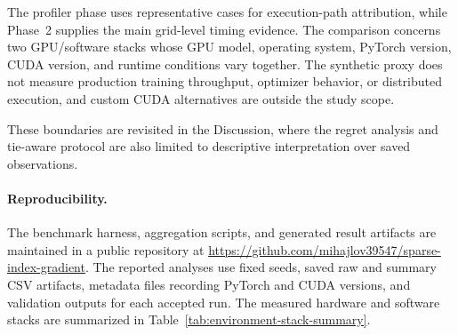The profiler phase uses representative cases for execution-path attribution, while Phase~2 supplies the main grid-level timing evidence. The comparison concerns two GPU/software stacks whose GPU model, operating system, PyTorch version, CUDA version, and runtime conditions vary together. The synthetic proxy does not measure production training throughput, optimizer behavior, or distributed execution, and custom CUDA alternatives are outside the study scope.

These boundaries are revisited in the Discussion, where the regret analysis and tie-aware protocol are also limited to descriptive interpretation over saved observations.

\paragraph{Reproducibility.}

The benchmark harness, aggregation scripts, and generated result artifacts are maintained in a public repository at \url{https://github.com/mihajlov39547/sparse-index-gradient}. The reported analyses use fixed seeds, saved raw and summary CSV artifacts, metadata files recording PyTorch and CUDA versions, and validation outputs for each accepted run. The measured hardware and software stacks are summarized in Table~\ref{tab:environment-stack-summary}.
